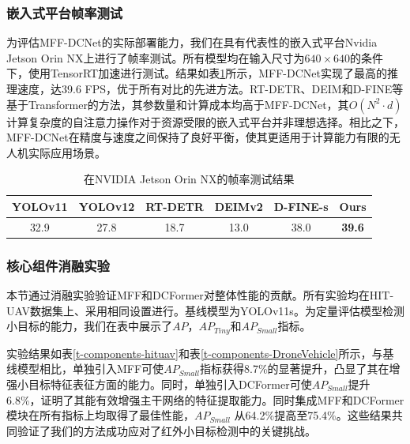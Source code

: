 \subsubsection{嵌入式平台帧率测试}
为评估MFF-DCNet的实际部署能力，我们在具有代表性的嵌入式平台Nvidia Jetson Orin NX上进行了帧率测试。所有模型均在输入尺寸为$640\times640$的条件下，使用TensorRT加速进行测试。结果如表\ref{t-fps}所示，MFF-DCNet实现了最高的推理速度，达39.6 FPS，优于所有对比的先进方法。RT-DETR、DEIM和D-FINE等基于Transformer的方法，其参数量和计算成本均高于MFF-DCNet，其$O(N^2\cdot d)$计算复杂度的自注意力操作对于资源受限的嵌入式平台并非理想选择。相比之下，MFF-DCNet在精度与速度之间保持了良好平衡，使其更适用于计算能力有限的无人机实际应用场景。

\begin{table}[H]
    \centering
    \caption{在NVIDIA Jetson Orin NX的帧率测试结果}
    \label{t-fps}
    \renewcommand{\arraystretch}{1.2} %
    \setlength{\tabcolsep}{6pt} %
    \begin{tabular}{c c c c c c}
        \toprule
        \textbf{YOLOv11} & \textbf{YOLOv12} & \textbf{RT-DETR} & \textbf{DEIMv2} & \textbf{D-FINE-s} & \textbf{Ours} \\
        \midrule
        32.9 & 27.8 & 18.7 & 13.0 & 38.0 & \textbf{39.6} \\
        \bottomrule
    \end{tabular}
\end{table}

\subsubsection{核心组件消融实验}
本节通过消融实验验证MFF和DCFormer对整体性能的贡献。所有实验均在HIT-UAV数据集上、采用相同设置进行。基线模型为YOLOv11s。为定量评估模型检测小目标的能力，我们在表中展示了$AP$，$AP_{Tiny}$和$AP_{Small}$指标。

实验结果如表\ref{t-components-hituav}和表\ref{t-components-DroneVehicle}所示，与基线模型相比，单独引入MFF可使$AP_{Small}$指标获得8.7\%的显著提升，凸显了其在增强小目标特征表征方面的能力。同时，单独引入DCFormer可使$AP_{Small}$提升 6.8\%，证明了其能有效增强主干网络的特征提取能力。同时集成MFF和DCFormer模块在所有指标上均取得了最佳性能，$AP_{Small}$ 从64.2\%提高至75.4\%。这些结果共同验证了我们的方法成功应对了红外小目标检测中的关键挑战。

